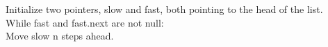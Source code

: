 \documentclass[preview]{standalone}
\begin{document}
Initialize two pointers, slow and fast, both pointing to the head of the list.\\While fast and fast.next are not null:\\Move slow n steps ahead.\\
\end{document}
